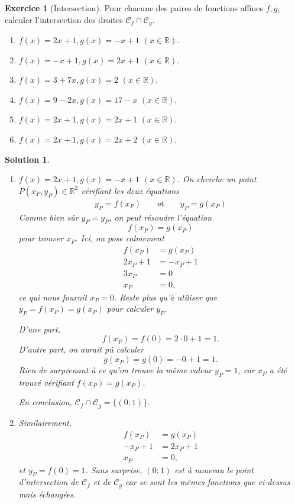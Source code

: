 \documentclass[12pt]{paper}
\theoremstyle{plain}
\newtheorem*{sol}{Solution}
\theoremstyle{definition}
\newtheorem{ex}{Exercice}
\newcommand{\C}{\mathcal{C}}
\newcommand{\R}{\mathbb{R}}
\newcommand{\exe}[2]{
		\begin{ex} #1  \end{ex}
		\begin{sol} #2 \end{sol}
	}
\newcommand{\exe}[2]{
		\begin{ex} #1  \end{ex}
	}
\begin{document}
\exe{[Intersection]
	Pour chacune des paires de fonctions affines $f,g$, calculer l'intersection des droites $\C_f \cap \C_g$.
	
	\begin{multicols}{2}
	\begin{enumerate}
		\item $f(x) = 2x + 1, g(x) = -x+1$ $(x\in\R)$.
		\item $f(x) = -x + 1, g(x) = 2x + 1$ $(x\in\R)$.
		\item $f(x) = 3+7x, g(x) = 2$ $(x\in\R)$.
		\item $f(x) = 9-2x, g(x) = 17-x$ $(x\in\R)$.
		\item $f(x) = 2x+1, g(x) = 2x+1$ $(x\in\R)$.
		\item $f(x) = 2x+1, g(x) = 2x+2$ $(x\in\R)$.
	\end{enumerate}
	\end{multicols}
}{

	\begin{enumerate}
		\item $f(x) = 2x + 1, g(x) = -x+1$ $(x\in\R)$.
			On cherche un point $P(x_P, y_P) \in \R^2$ vérifiant les deux équations
				\begin{align*}
					y_P = f(x_P) && \text{ et } && y_P = g(x_P)
				\end{align*}
			Comme bien sûr $y_P = y_P$, on peut résoudre l'équation
				\[ f(x_P) = g(x_P) \]
			pour trouver $x_P$.
			Ici, on pose calmement
				\begin{align*}
					f(x_P) &= g(x_P) \\
					2x_P + 1 &= -x_P + 1 \\
					3x_P &= 0 \\
					x_P &= 0,
				\end{align*}
			ce qui nous fournit $x_P = 0$.
			Reste plus qu'à utiliser que $y_P = f(x_P) = g(x_P)$ pour calculer $y_P$.
			
			D'une part, 
				\[ f(x_P) = f(0) = 2\cdot0 + 1 = 1. \]
			D'autre part, on aurait pû calculer
				\[ g(x_P) = g(0) = -0 + 1 = 1. \]
			Rien de surprenant à ce qu'on trouve la même valeur $y_P = 1$, car $x_P$ a été trouvé vérifiant $f(x_P) = g(x_P)$.
			
			En conclusion, $\C_f \cap \C_g = \{ (0;1) \}$.
			
		\item 
			Similairement,
			\begin{align*}
				f(x_P) &= g(x_P) \\
				-x_P + 1 & = 2x_P + 1 \\
				x_P &= 0,
			\end{align*}
			et $y_P = f(0) = 1$.
			Sans surprise, $(0;1)$ est à nouveau le point d'intersection de $\C_f$ et de $\C_g$ car se sont les mêmes fonctions que ci-dessus mais échangées.
		

\end{enumerate}}
\end{document}
